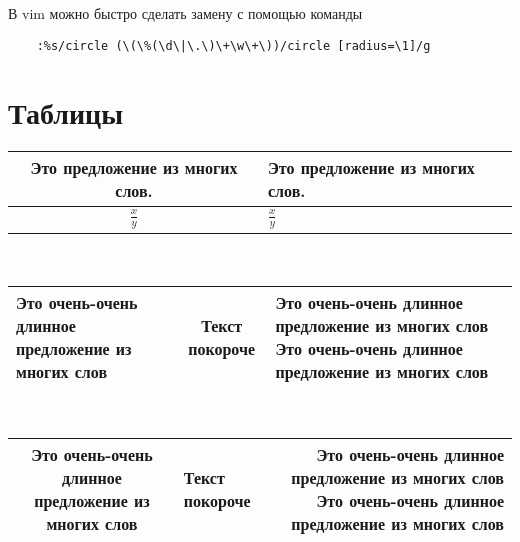 В vim можно быстро сделать замену с помощью команды
\begin{verbatim}
    :%s/circle (\(\%(\d\|\.\)\+\w\+\))/circle [radius=\1]/g
\end{verbatim}

\section{Таблицы}

\setlength{\extrarowheight}{5mm}
\begin{tabular}{|cp{4cm}|} %
    \hline
    Это предложение из многих слов. &
    Это предложение из многих слов.
    \\
    \hline
    $\displaystyle \frac{x}{y}$     &
    $\displaystyle \frac{x}{y}$
    \\[5mm] %
    \hline
\end{tabular}
\setlength{\extrarowheight}{0mm}
\\

\begin{tabularx}{\textwidth}{|X|c|X|}
    \hline
    Это очень-очень длинное предложение из многих слов &
    Текст покороче                                     &
    Это очень-очень длинное предложение из многих слов Это очень-очень длинное предложение из многих слов
    \\ \hline
\end{tabularx}
\\

\begin{tabulary}{\textwidth}{|C|J|R|}
    \hline
    Это очень-очень длинное предложение из многих слов &
    Текст покороче &
    Это очень-очень длинное предложение из многих слов Это очень-очень длинное предложение из многих слов
    \\ \hline
\end{tabulary}


